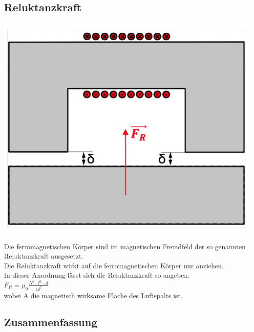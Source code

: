 \subsection{Reluktanzkraft}
\begin{minipage}{0.4 \linewidth}
\includegraphics[width = \linewidth]{./Pics/VL2/reluktanz}
\end{minipage}
\begin{minipage}{0.6 \linewidth}
Die ferromagnetischen Körper sind im magnetischen Fremdfeld der so genannten Reluktanzkraft ausgesetzt. \\

Die Reluktanzkraft wirkt auf die ferromagnetischen Körper nur anziehen. \\

In dieser Anordnung lässt sich die Reluktanzkraft so angeben: \\

$F_R  = \mu_0 \frac{N^2 \cdot I^2 \cdot A}{4 \delta^2}$ \\

wobei A die magnetisch wirksame Fläche des Luftspalts ist.
\end{minipage}

\subsection{Zusammenfassung}

